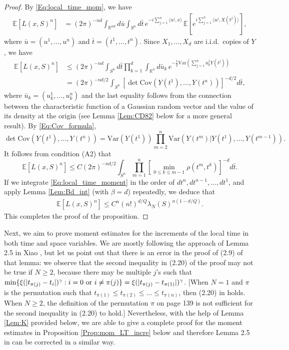 \documentclass[11pt, reqno]{amsart}
\def\R{{\mathbb R}}
\def\E{{\mathbb E}}
\numberwithin{equation}{section}
\begin{document}
\begin{proof}
By \eqref{Eq:local_time_mom}, we have
\begin{align*}
\E[L(x, S)^n] &= (2\pi)^{-nd} \int_{\R^{nd}} d\bar{u} \int_{S^n} d\bar{t} \, e^{-i\sum_{j=1}^n \langle u^j, x\rangle}\,
 \E\left[e^{i\sum_{j=1}^n\langle u^j, X(t^j) \rangle}\right],
\end{align*}
where $\bar{u} = (u^1, \dots, u^n)$ and $\bar{t} = (t^1, \dots, t^n)$.
Since $X_1, \dots, X_d$ are i.i.d.~copies of $Y$, we have
\begin{align*}
\E[L(x, S)^n] & \le (2\pi)^{-nd} \int_{S^n} d\bar{t} \prod_{k=1}^d \int_{\R^{n}} d\bar{u}_k  \, e^{-\frac{1}{2}
\mathrm{Var}(\sum_{j=1}^n u^j_k Y(t^j))}\\
& = (2\pi)^{-nd/2} \int_{S^n} \left[ \det \mathrm{Cov}(Y(t^1), \dots, Y(t^n)) \right]^{-d/2} d\bar{t},
\end{align*}
where $\bar{u}_k = (u^1_k, \dots, u^n_k)$ and the last equality follows from the connection between 
the characteristic function of a Gaussian random vector and the value of its density at the origin
(see Lemma \ref{Lem:CD82} below for a more general result). 
By \eqref{Eq:Cov_formula},
\[ \det\mathrm{Cov}(Y(t^1), \dots, Y(t^n)) = \mathrm{Var}(Y(t^1)) \prod_{m=2}^n \mathrm{Var}(Y(t^m)|Y(t^1), \dots, Y(t^{m-1})). 
\]
It follows from condition (A2) that
\begin{equation}\label{Eq:local_time_moment}
\E[L(x, S)^n]  \le C (2\pi)^{-nd/2} \int_{S^n} \prod_{m=1}^n \left[\min_{0 \le k \le m-1}\rho(t^m, t^k)\right]^{-d} d\bar{t}.
\end{equation}
If we integrate \eqref{Eq:local_time_moment} in the order of $dt^n, dt^{n-1}, \dots, dt^1$, and apply Lemma 
\ref{Lem:Bd_int} (with $\beta = d$) repeatedly, we deduce that
\begin{align*}
\E[L(x, S)^n] \le C^n (n!)^{d/Q} \lambda_N(S)^{n(1-d/Q)}.
\end{align*}
This completes the proof of the proposition.
\end{proof}

Next, we aim to prove moment estimates for the increments of the local time in both time and space variables. 
We are mostly following the approach of Lemma 2.5 in Xiao \cite{X97}, but let us point out that there is an 
error in the proof of (2.9) of that lemma: we observe that the second inequality in (2.20) of the proof may not 
be true if $N \ge 2$, because there may be multiple $j$'s such that $\min\{\xi(|t_{\pi(j)} - t_i|)^\gamma : 
i = 0 \textup{ or } i \ne \pi(j)\} 
= \xi(|t_{\pi(j)} - t_{\pi(1)}|)^\gamma$. [When $N=1$ and $\pi$ is the permutation such that $t_{\pi(1)}
 \le t_{\pi(2)}\le \ldots \le t_{\pi(n)}$, then (2.20) in \cite{X97} holds. When $N\ge 2$, the definition of the permutation $\pi$
 on page 139 is not sufficient for the second inequality in  (2.20) to hold.] Nevertheless, with the help of Lemma 
 \ref{Lem:K} provided below, we are able to give a complete proof for the moment estimates in Proposition 
 \ref{Prop:mom_LT_incre} below and therefore Lemma 2.5 in \cite{X97} can be corrected in a similar way.
\end{document}
